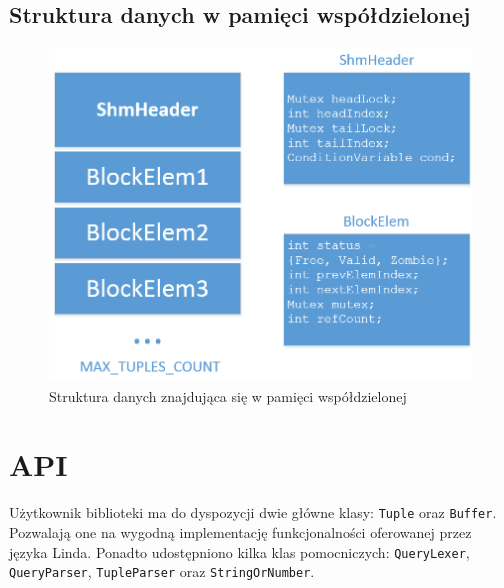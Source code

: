 \documentclass[a4paper]{article}
\begin{document}
	\subsection{Struktura danych w pamięci współdzielonej}
	\begin{figure}[H]
	\centering
	\includegraphics[width=130mm]{images/struct.png}
	\caption{Struktura danych znajdująca się w pamięci współdzielonej}
	\end{figure}


	\section{API}
	Użytkownik biblioteki ma do dyspozycji dwie główne klasy: \texttt{Tuple} oraz \texttt{Buffer}. Pozwalają one na wygodną implementację funkcjonalności oferowanej przez języka Linda. Ponadto udostępniono kilka klas pomocniczych: \texttt{QueryLexer}, \texttt{QueryParser}, \texttt{TupleParser} oraz \texttt{StringOrNumber}.
\end{document}
